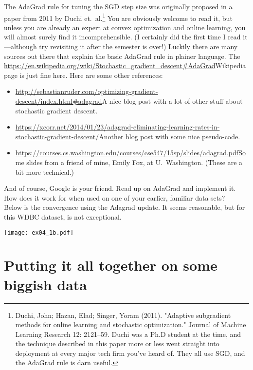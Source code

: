 \documentclass{article}
\begin{document}
\begin{enumerate}[(A)]
The AdaGrad rule for tuning the SGD step size was originally proposed in a paper from 2011 by Duchi et.~al.\footnote{Duchi, John; Hazan, Elad; Singer, Yoram (2011). "Adaptive subgradient methods for online learning and stochastic optimization."  Journal of Machine Learning Research 12: 2121--59.  Duchi was a Ph.D student at the time, and the technique described in this paper more or less went straight into deployment at every major tech firm you've heard of.  They all use SGD, and the AdaGrad rule is darn useful.}  You are obviously welcome to read it, but unless you are already an expert at convex optimization and online learning, you will almost surely find it incomprehensible.  (I certainly did the first time I read it---although try revisiting it after the semester is over!)  Luckily there are many sources out there that explain the basic AdaGrad rule in plainer language.  The \url{https://en.wikipedia.org/wiki/Stochastic_gradient_descent#AdaGrad}{Wikipedia page} is just fine here.  Here are some other references:
\begin{itemize}
\item \url{http://sebastianruder.com/optimizing-gradient-descent/index.html#adagrad}{A nice blog post} with a lot of other stuff about stochastic gradient descent.
\item \url{https://xcorr.net/2014/01/23/adagrad-eliminating-learning-rates-in-stochastic-gradient-descent/}{Another blog post} with some nice pseudo-code.
\item \url{https://courses.cs.washington.edu/courses/cse547/15sp/slides/adagrad.pdf}{Some slides from a friend of mine}, Emily Fox, at U.~Washington.  (These are a bit more technical.)
\end{itemize}
And of course, Google is your friend.  Read up on AdaGrad and implement it.  How does it work for when used on one of your earlier, familiar data sets?
\\
\color{blue}
Below is the convergence using the Adagrad update. It seems reasonable, but for this WDBC dataset, is not exceptional. 
\begin{center}
\texttt{[image: ex04\_1b.pdf]}
\end{center}
\color{black}

\end{enumerate}


\section{Putting it all together on some biggish data}
\end{document}
